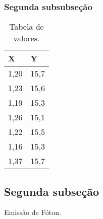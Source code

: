 \documentclass[a4paper,12pt,oneside,onecolumn]{uerj/uerj}
\begin{document}
\subsubsection{Segunda subsubseção}

\begin{table}[ht]
  \centering
  \caption{Tabela de valores.}
  \begin{tabular}{l|l}
    \hline
      X & Y\\
    \hline
      1,20 & 15,7\\
      1,23 & 15,6\\
      1,19 & 15,3\\
      1,26 & 15,1\\
      1,22 & 15,5\\
      1,16 & 15,3\\
      1,37 & 15,7\\
    \hline
  \end{tabular}
\end{table}

\subsection{Segunda subseção}

\alglinenumberson
\begin{algorithm}[!ht]
    \caption{Emissão de Fóton.} \label{alg:emissao}
    \begin{pseudocode}
      \Algoritmo{}
          \FimEnquanto
        \Senao
            \FimPara
          \Senao
      \Continua
    \end{pseudocode}
\end{algorithm}
\end{document}
